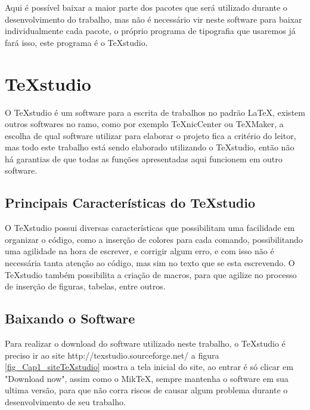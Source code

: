 Aqui é possível baixar a maior parte dos pacotes que será utilizado durante o desenvolvimento do trabalho, mas não é necessário vir neste software para baixar individualmente cada pacote, o próprio programa de tipografia que usaremos já fará isso, este programa é o TeXstudio.

\section{TeXstudio}
O TeXstudio é um software para a escrita de trabalhos no padrão \LaTeX, existem outros softwares no ramo, como por exemplo TeXnicCenter ou TeXMaker, a escolha de qual software utilizar para elaborar o projeto fica a critério do leitor, mas todo este trabalho está sendo elaborado utilizando o TeXstudio, então não há garantias de que todas as funções apresentadas aqui funcionem em outro software.

\subsection{Principais Características do TeXstudio}
O TeXstudio possui diversas características que possibilitam uma facilidade em organizar o código, como a inserção de colores para cada comando, possibilitando uma agilidade na hora de escrever, e corrigir algum erro, e com isso não é necessária tanta atenção ao código, mas sim no texto que se esta escrevendo. O TeXstudio também possibilita a criação de macros, para que agilize no processo de inserção de figuras, tabelas, entre outros.

\subsection{Baixando o Software}
Para realizar o download do software utilizado neste trabalho, o TeXstudio é preciso ir ao site http://texstudio.sourceforge.net/ a figura \ref{fig_Cap1_siteTeXstudio} mostra a tela inicial do site, ao entrar é só clicar em "Download now", assim como o MikTeX, sempre mantenha o software em sua ultima versão, para que não corra riscos de causar algum problema durante o desenvolvimento de seu trabalho.

